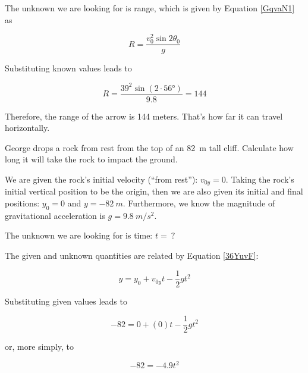 \documentclass[main-physics.tex]{subfiles}
\begin{document}
\vspace{1em}

The unknown we are looking for is range, which is given by Equation \eqref{GqvaN1} as

\begin{equation*}
    R = \frac{v_0^2 \sin{2\theta_0}}{g}
\end{equation*}

Substituting known values leads to

\begin{equation*}
    R = \frac{39^2 \sin{(2 \cdot \ang{56})}}{9.8} = 144
\end{equation*}

Therefore, the range of the arrow is 144 meters. That's how far it can travel horizontally.

\endsolution

\begin{example} \label{9XXF9X}
    George drops a rock from rest from the top of an \SI{82}{m} tall cliff. Calculate how long it will take the rock to impact the ground. 
\end{example}

\Solution We are given the rock's initial velocity (``from rest''): $v_{0y} = 0$. Taking the rock's initial vertical position to be the origin, then we are also given its initial and final positions: $y_0 = 0$ and $y = \SI{-82}{m}$. Furthermore, we know the magnitude of gravitational acceleration is $g = \SI{9.8}{m/s^2}$. 

\vspace{1em}

The unknown we are looking for is time: $t =\ ?$

\vspace{1em}

The given and unknown quantities are related by Equation \eqref{36YuvF}:

\begin{equation*}
    y = y_0 + v_{0y}t - \frac{1}{2}  g t^2
\end{equation*}

Substituting given values leads to 

\begin{equation*}
    -82 = 0 + (0) t - \frac{1}{2} g t^2
\end{equation*}

or, more simply, to

\begin{equation*}
    -82 = - 4.9 t^2
\end{equation*}
\end{document}
